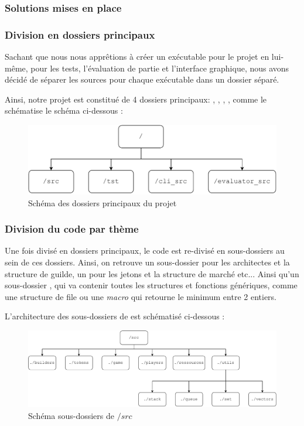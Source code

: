 \subsubsection*{Solutions mises en place}


\subsubsection*{Division en dossiers principaux}


Sachant que nous nous apprêtions à créer un exécutable pour le projet en lui-même, pour les tests, l'évaluation de partie et l'interface graphique, nous avons décidé de séparer les sources pour chaque exécutable dans un dossier séparé.


Ainsi, notre projet est constitué de 4 dossiers principaux: , , , , comme le schématise le schéma ci-dessous :


\begin{center}
    \begin{figure}[H]
        \centering
        \includegraphics[width=.5\textwidth]{img/main_directories.pdf}
        \caption{Schéma des dossiers principaux du projet}
        \label{fig:main_dirs}
    \end{figure}
\end{center}




\subsubsection*{Division du code par thème}


Une fois divisé en dossiers principaux, le code est re-divisé en sous-dossiers au sein de ces dossiers. Ainsi, on retrouve un
sous-dossier pour les architectes et la structure de guilde, un pour les 
jetons et la structure de marché etc... Ainsi qu'un sous-dossier ,
qui va contenir toutes les structures et fonctions génériques, comme
une structure de file ou une \textit{macro}  qui retourne le minimum entre 2 entiers.

    L'architecture des sous-dossiers de  est schématisé ci-dessous :


\begin{center}
    \begin{figure}[H]
        \centering
        \includegraphics[width=.8\textwidth]{img/src_sub_dir.pdf}
        \caption{Schéma sous-dossiers de $/src$}
        \label{fig:src_sub_dirs}
    \end{figure}
\end{center}


